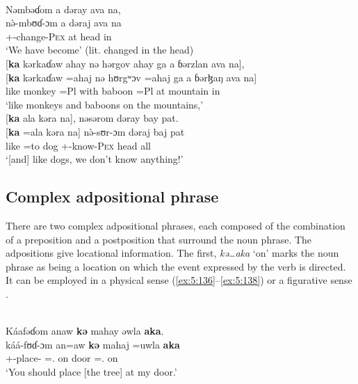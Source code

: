 \clearpage
\ea \label{ex:5:135}\\
Nəmbəɗom  a  dəray  ava  na,   \\
\gll  n\`{ə}-mbʊɗ{}-ɔm    a  dəraj  ava  na\\
      +{\PFV}-change-\textsc{Pex}  at   head  in    {\PSP}\\
\glt ‘We have become’ (lit. changed in the head)\\
\medskip
{}[\textbf{ka} kərkaɗaw  ahay  nə  hərgov  ahay  ga  a  ɓərzlan  ava  na], \\
\gll  {}[\textbf{ka} kərkaɗaw =ahaj nə hʊrgʷɔv =ahaj ga a ɓərɮaŋ ava na]\\
      like  monkey   =Pl  with    baboon  =Pl  {\ADJ}  at  mountain    in    {\PSP}\\
\glt ‘like monkeys and baboons on the mountains,’ \\     
\medskip
{}[\textbf{ka}  ala  kəra    na],  nəsərom  dəray  bay  pat.\\
\gll  {}[\textbf{ka}  =ala kəra na]  n\`{ə}-sʊr-ɔm dəraj baj pat\\
      like  =to  dog      {\PSP}  +{\PFV}-know-\textsc{Pex}  head  {\NEG}  all\\
\glt  ‘[and] like dogs, we don’t know anything!’
\z

\subsection{Complex adpositional phrase}\label{sec:5.6.2}
\hypertarget{RefHeading1211861525720847}{}
There are two complex adpositional phrases, each composed of the combination of a preposition and a postposition that surround the noun phrase. The adpositions give locational information. The first, \textit{kə…aka} ‘on’ marks the noun phrase as being a location on which the event expressed by the verb is directed. It can be employed in a physical sense (\ref{ex:5:136}--\ref{ex:5:138}) or a figurative sense .  


\ea \label{ex:5:136}\\
Káafəɗom  anaw  \textbf{kə} mahay  əwla \textbf{aka}.\\
\gll  káá-fʊɗ-ɔm    an=aw    \textbf{kə} mahaj  =uwla \textbf{aka}\\
      +{\POT}-place-{\twoP}  {\DAT}={\oneS}.{\IO}  on  door  ={\oneS}.{\POSS}  on\\
\glt  ‘You should place  [the tree] at my door.’  
\z

